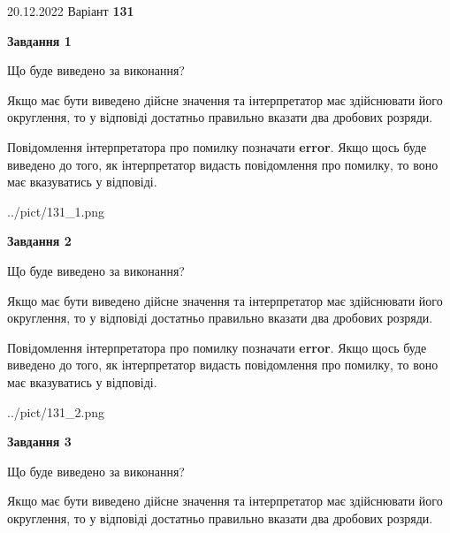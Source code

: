 \documentclass[12pt, ukrainian]{article}
\begin{document}
{20.12.2022 Варіант \No \textbf { 131 }\par}
{
\begin {Large}

{\begin {center}\textbf{Завдання 1}\end {center}}\par
Що буде виведено за виконання? \par

Якщо має бути виведено дійсне значення та інтерпретатор має здійснювати його округлення, 
то у відповіді достатньо правильно вказати два дробових розряди.

Повідомлення інтерпретатора про помилку позначати \textbf{error}.
Якщо щось буде виведено до того, як інтерпретатор видасть повідомлення про помилку, 
то воно має вказуватись у відповіді. \par

\begin{center}
	{../pict/131_1.png}
\end{center}
\newpage

{\begin {center}\textbf{Завдання 2}\end {center}}\par
Що буде виведено за виконання? \par

Якщо має бути виведено дійсне значення та інтерпретатор має здійснювати його округлення, 
то у відповіді достатньо правильно вказати два дробових розряди.

Повідомлення інтерпретатора про помилку позначати \textbf{error}.
Якщо щось буде виведено до того, як інтерпретатор видасть повідомлення про помилку, 
то воно має вказуватись у відповіді. \par

\begin{center}
	{../pict/131_2.png}
\end{center}
\newpage

{\begin {center}\textbf{Завдання 3}\end {center}}\par
Що буде виведено за виконання? \par

Якщо має бути виведено дійсне значення та інтерпретатор має здійснювати його округлення, 
то у відповіді достатньо правильно вказати два дробових розряди.


\end{Large}}
\end{document}
